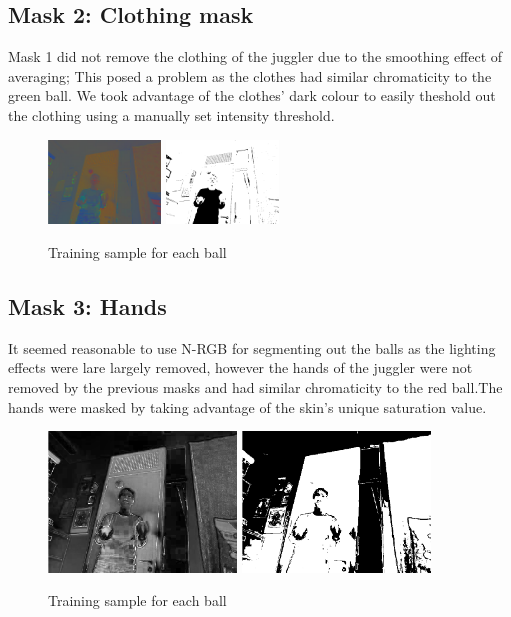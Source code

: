 \documentclass[10pt,a4paper,oneclumn]{article}
\begin{document}
\subsection{Mask 2: Clothing mask}

Mask 1 did not remove the clothing of the juggler due to the smoothing effect of averaging; This posed a problem as the clothes had similar chromaticity to the green ball. We took advantage of the clothes' dark colour to easily theshold out the clothing using a manually set intensity threshold.

\begin{figure}[h!]
\centering
  \includegraphics[width=3cm]{figures/imnrgb.png}
  \includegraphics[width=3cm]{figures/clothes_mask.png}
\caption{Training sample for each ball}
\end{figure}

\subsection{Mask 3: Hands}
It seemed reasonable to use N-RGB for segmenting out the balls as the lighting effects were lare largely removed, however the hands of the juggler were not removed by the previous masks and had similar chromaticity to the red ball.The hands were masked by taking advantage of the skin's unique saturation value.

\begin{figure}[h!]
\centering
  \includegraphics[width=5cm]{figures/imsat.png}
  \includegraphics[width=5cm]{figures/imhsvsatmask.png}
\caption{Training sample for each ball}
\end{figure}
\end{document}
